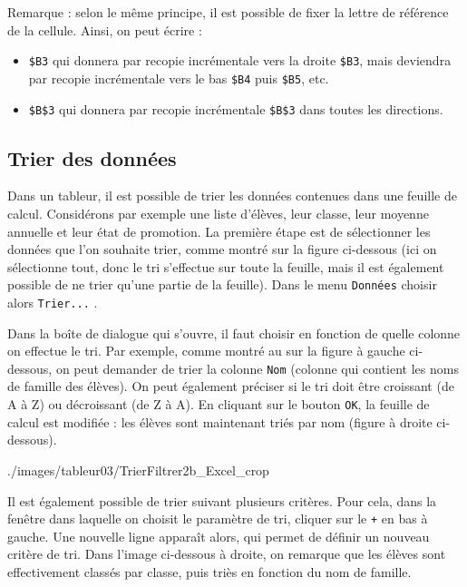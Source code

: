Remarque : selon le même principe, il est possible de fixer la lettre de référence de la cellule. Ainsi, on peut écrire :

\begin{itemize}
	\item \texttt{\$B3} qui donnera par recopie incrémentale vers la droite \texttt{\$B3}, mais deviendra par recopie incrémentale vers le bas \texttt{\$B4} puis \texttt{\$B5}, etc.
	\item \texttt{\$B\$3} qui donnera par recopie incrémentale \texttt{\$B\$3} dans toutes les directions.
\end{itemize}

\subsection{Trier des données}\label{Calc3tri} 

Dans un tableur, il est possible de trier les données contenues dans une feuille de calcul. Considérons par exemple une liste d'élèves, leur classe, leur moyenne annuelle et leur état de promotion. La première étape est de sélectionner les données que l'on souhaite trier, comme montré sur la figure ci-dessous  (ici on sélectionne tout, donc le tri s'effectue sur toute la feuille, mais il est également possible de ne trier qu'une partie de la feuille). Dans le menu \texttt{Données}  choisir alors \texttt{Trier...} .


Dans la boîte de dialogue qui s'ouvre, il faut choisir en fonction de quelle colonne on effectue le tri. Par exemple, comme montré au  sur la figure à gauche ci-dessous, on peut demander de trier la colonne \texttt{Nom} (colonne qui contient les noms de famille des élèves). On peut également préciser  si le tri doit être croissant (de A à Z) ou décroissant (de Z à A). En cliquant sur le bouton \texttt{OK}, la feuille de calcul est modifiée : les élèves sont maintenant triés par nom (figure à droite ci-dessous).

%
{./images/tableur03/TrierFiltrer2b_Excel_crop}{\textwidth}

Il est également possible de trier suivant plusieurs critères. Pour cela, dans la fenêtre dans laquelle on choisit le paramètre de tri, cliquer sur le  \texttt{+} en bas à gauche. Une nouvelle ligne apparaît alors, qui permet de définir un nouveau critère de tri. Dans l'image ci-dessous à droite, on remarque que les élèves sont effectivement classés par classe, puis triès en fonction du nom de famille.

